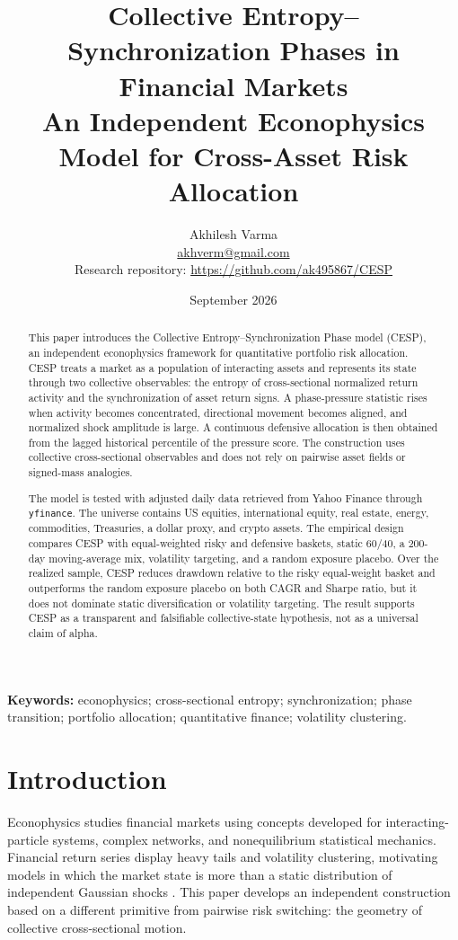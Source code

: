 \documentclass[11pt]{article}
\title{
    Collective Entropy--Synchronization Phases in Financial Markets\\
    \large An Independent Econophysics Model for Cross-Asset Risk Allocation
}
\author{
    Akhilesh Varma\\
    \small \href{mailto:akhverm@gmail.com}{akhverm@gmail.com}\\
    \small Research repository: \url{https://github.com/ak495867/CESP}
}
\date{September 2026}
\begin{document}
\maketitle

\begin{abstract}

This paper introduces the Collective Entropy--Synchronization Phase model (CESP),
an independent econophysics framework for quantitative portfolio risk allocation.
CESP treats a market as a population of interacting assets and represents its state
through two collective observables: the entropy of cross-sectional normalized
return activity and the synchronization of asset return signs. A phase-pressure
statistic rises when activity becomes concentrated, directional movement becomes
aligned, and normalized shock amplitude is large. A continuous defensive allocation
is then obtained from the lagged historical percentile of the pressure score. The
construction uses collective cross-sectional observables and does not rely on
pairwise asset fields or signed-mass analogies.

The model is tested with adjusted daily data retrieved from Yahoo Finance through
\texttt{yfinance}. The universe contains US equities, international equity, real
estate, energy, commodities, Treasuries, a dollar proxy, and crypto assets. The
empirical design compares CESP with equal-weighted risky and defensive baskets,
static 60/40, a 200-day moving-average mix, volatility targeting, and a random
exposure placebo. Over the realized sample, CESP reduces drawdown relative to
the risky equal-weight basket and outperforms the random exposure placebo on both
CAGR and Sharpe ratio, but it does not dominate static diversification or
volatility targeting. The result supports CESP as a transparent and falsifiable
collective-state hypothesis, not as a universal claim of alpha.

\end{abstract}

\noindent\textbf{Keywords:} econophysics; cross-sectional entropy; synchronization;
phase transition; portfolio allocation; quantitative finance; volatility clustering.

\section{Introduction}

Econophysics studies financial markets using concepts developed for interacting-particle
systems, complex networks, and nonequilibrium statistical mechanics. Financial return
series display heavy tails and volatility clustering, motivating models in which the
market state is more than a static distribution of independent Gaussian shocks
\citep{gopikrishnan1999,yamasaki2005}. This paper develops an independent construction
based on a different primitive from pairwise risk switching: the geometry of collective
cross-sectional motion.
\end{document}
